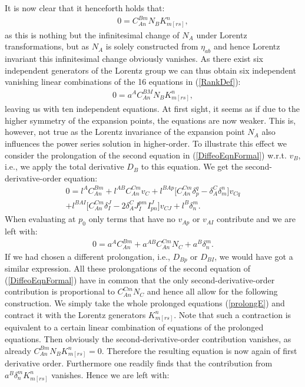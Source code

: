 It is now clear that it henceforth holds that:
\begin{align}
    0 = C^{Bm}_{An}N_B K_{m[rs]}^n,
\end{align}
as this is nothing but the infinitesimal change of $N_A$ under Lorentz transformations, but as $N_A$ is solely constructed from $\eta_{ab}$ and hence Lorentz invariant this infinitesimal change obviously vanishes. As there exist six independent generators of the Lorentz group we can thus obtain six independent vanishing linear combinations of the 16 equations in (\ref{RankDef}):
\begin{align}
    0 = a^A C^{BM}_{An}N_B K_{m[rs]}^n,
\end{align}
leaving us with ten independent equations. At first sight, it seems as if due to the higher symmetry of the expansion points, the equations are now weaker. This is, however, not true as the Lorentz invariance of the expansion point $N_A$ also influences the power series solution in higher-order. To illustrate this effect we consider the prolongation of the second equation in (\ref{DiffeoEqnFormal}) w.r.t. $v_B$, i.e., we apply the total derivative $D_B$ to this equation. We get the second-derivative-order equation:
\begin{multline}
    0 = l^AC_{An}^{Bm} + l^{AB}C_{An}^{Cm}v_C + l^{BAp} \bigl[ C_{An}^{Cm} \delta_p^q - \delta_A^C \delta_m^n \bigr] v_{Cq}\\
    + l^{BAI} \bigl[ C_{An}^{Cm} \delta_I^J - 2 \delta_A^C J_I^{pm} I^J_{pn}  \bigr] v_{CJ} + l^{B} \delta^m_n.
\end{multline}
When evaluating at $p_0$ only terms that have no $v_{Ap}$ or $v_{AI}$ contribute and we are left with:
\begin{align}\label{prolongE}
    0 = a^A C_{An}^{Bm} + a^{AB} C_{An}^{Cm} N_C +  a^B \delta^m_n.
\end{align}
If we had chosen a different prolongation, i.e., $D_{Bp}$ or $D_{BI}$, we would have got a similar expression. All these prolongations of the second equation of (\ref{DiffeoEqnFormal}) have in common that the only second-derivative-order contribution is proportional to $C^{Cm}_{An} N_C$ and hence all allow for the following construction. We simply take the whole prolonged equations (\ref{prolongE}) and contract it with the Lorentz generators $K_{m[rs]}^n$. Note that such a contraction is equivalent to a certain linear combination of equations of the prolonged equations. Then obviously the second-derivative-order contribution vanishes, as already $C_{An}^{Bm} N_B K_{m[rs]}^n = 0$.  Therefore the resulting equation is now again of first derivative order. Furthermore one readily finds that the contribution from $a^B \delta^m_n K_{m[rs]}^n$ vanishes. Hence we are left with: 
